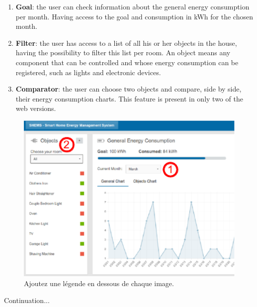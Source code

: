 \documentclass{chi-ext}
\begin{document}
\begin{enumerate}
\item \textbf{Goal}: the user can check information about the general energy consumption per month. Having access to the goal and consumption in kWh for the chosen month. 

\item \textbf{Filter}: the user has access to a list of all his or her objects in the house, having the possibility to filter this list per room. An object means any component that can be controlled and whose energy consumption can be registered, such as lights and electronic devices.

\item \textbf{Comparator}: the user can choose two objects and compare, side by side, their energy consumption charts. This feature is present in only two of the web versions.
\end{enumerate} 

\begin{figure}
  \centering
  \includegraphics[width=\linewidth]{images/web0_goal-filter.eps}
  \caption{Ajoutez une légende en dessous de chaque image.}
  \label{fig:sample}
\end{figure}

Continuation...
\end{document}
